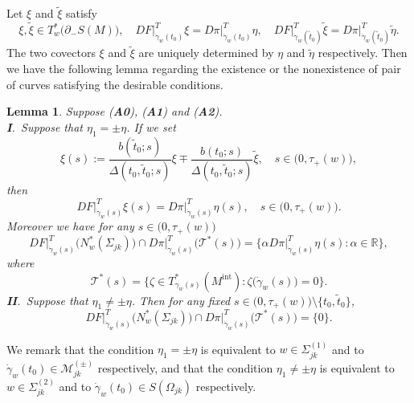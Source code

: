 \documentclass[a4paper,11pt,reqno]{amsart}
\numberwithin{equation}{section}
\newtheorem{lemma}[theorem]{Lemma}
\theoremstyle{definition}
\theoremstyle{remark}
\begin{document}
%
%
Let $\xi$ and $\tilde{\xi}$ satisfy 
%
%
$$
\xi, \tilde{\xi} \in T^\ast_w\bigl(\partial_-S(M)\bigr), 
\quad
DF\vert^T_{\dot{\gamma}_w(t_0)}\xi
=
D\pi\vert^T_{\dot{\gamma}_w(t_0)}\eta, 
\quad
DF\vert^T_{\dot{\gamma}_w(\tilde{t}_0)}\tilde{\xi}
=
D\pi\vert^T_{\dot{\gamma}_w(\tilde{t}_0)}\tilde{\eta}.  
$$
%
%
The two covectors $\xi$ and $\tilde{\xi}$ are uniquely determined by 
$\eta$ and $\tilde{\eta}$ respectively. 
Then we have the following lemma regarding the existence or the nonexistence of 
pair of curves satisfying the desirable conditions. 
%
%
\begin{lemma}
\label{theorem:propagation}
Suppose {\rm ({\bf A0})}, {\rm ({\bf A1})} and {\rm ({\bf A2})}. 
%
%
\vspace{6pt}
\\
{\bf I}.\ 
Suppose that $\eta_1=\pm\eta$. 
If we set 
%
%
\begin{equation}
\xi(s)
:=
\frac{b(\tilde{t}_0;s)}{\Delta(t_0,\tilde{t}_0;s)}\xi
\mp
\frac{b(t_0;s)}{\Delta(t_0,\tilde{t}_0;s)}\tilde{\xi},
\quad
s\in \bigl(0,\tau_+(w)\bigr),
\label{equation:xiofs} 
\end{equation}
%
% 
then  
%
%
\begin{equation}
DF\vert^T_{\dot{\gamma}_w(s)}\xi(s)
=
D\pi\vert^T_{\dot{\gamma}_w(s)}\eta(s),
\quad
s\in \bigl(0,\tau_+(w)\bigr). 
\label{equation:identity1}
\end{equation}
%
%
Moreover we have for any $s \in \bigl(0,\tau_+(w)\bigr)$
%
%
\begin{equation}
DF\vert^T_{\dot{\gamma}_w(s)}\bigl(N^\ast_w(\Sigma_{jk})\bigr)
\cap
D\pi\vert^T_{\dot{\gamma}_w(s)}\bigl(\mathcal{T}^\ast(s)\bigr)
=
\{\alpha D\pi\vert^T_{\dot{\gamma}_w(s)}\eta(s) : \alpha\in\mathbb{R}\},
\label{equation:identity2}
\end{equation}
%
%
where
%
%
$$
\mathcal{T}^\ast(s)
=
\bigl\{
\zeta \in T^\ast_{\gamma_w(s)}(M^\text{int}) : 
\zeta\bigl(\dot{\gamma}_w(s)\bigr)=0
\bigr\}. 
$$
%
%
{\bf II}.\ 
Suppose that $\eta_1\ne\pm\eta$. 
Then for any fixed 
$s \in \bigl(0,\tau_+(w)\bigr)\setminus\{t_0,\tilde{t}_0\}$, 
%
%
$$
DF\vert^T_{\dot{\gamma}_w(s)}\bigl(N^\ast_w(\Sigma_{jk})\bigr)
\cap
D\pi\vert^T_{\dot{\gamma}_w(s)}\bigl(\mathcal{T}^\ast(s)\bigr)
=
\{0\}.
$$
%
%
\end{lemma}
%
%
We remark that the condition $\eta_1=\pm\eta$ is equivalent 
to $w \in \Sigma_{jk}^{(1)}$ and 
to $\dot{\gamma}_w(t_0) \in \mathcal{M}_{jk}^{(\pm)}$ respectively, 
and that the condition $\eta_1\ne\pm\eta$ 
is equivalent to $w \in \Sigma_{jk}^{(2)}$ and to 
$\dot{\gamma}_w(t_0) \in S(\Omega_{jk})$ respectively. 
\end{document}
